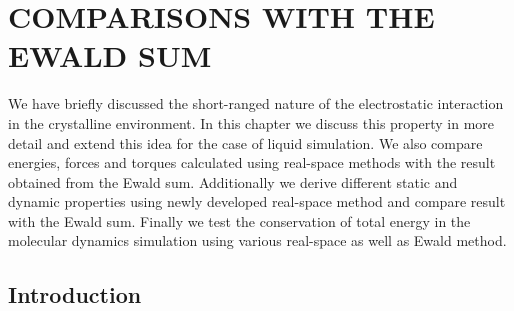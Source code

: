 %
%
%
%
%
%
%
%
%
%

%
%

\chapter{COMPARISONS WITH THE EWALD SUM}
\label{chap:compEwald}

We have briefly discussed the short-ranged nature of the electrostatic interaction in the crystalline environment. In this chapter we discuss this property in more detail and extend this idea for the case of liquid simulation. We also compare energies, forces and torques calculated using real-space methods with the result obtained from the Ewald sum. Additionally we derive different static and dynamic properties using newly developed real-space method and compare result with the Ewald sum. Finally we test the conservation of total energy in the molecular dynamics simulation using various real-space as well as Ewald method.  

\section{Introduction}

